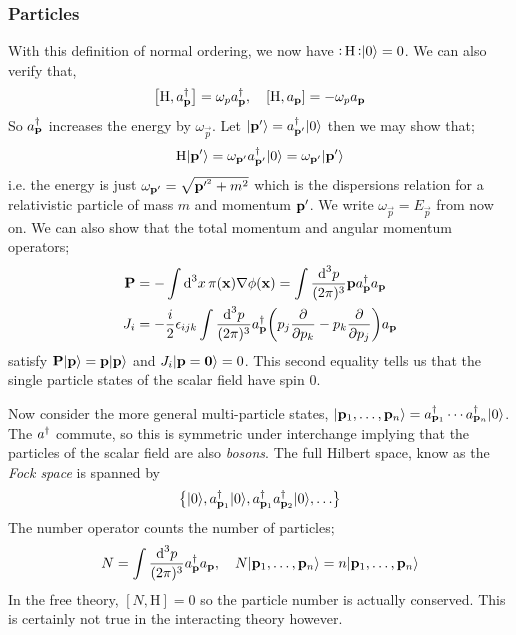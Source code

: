 \subsubsection{Particles}
With this definition of normal ordering, we now have $\normord{\text{H}}\ket{0} = 0$. We can also verify that,
\begin{equation}
\left[\text{H}, a_{\vec p}\dagg\right] = \omega_p a_{\vec p}\dagg, \quad \left[\text{H}, a_{\vec p}\right] = -\omega_p a_{\vec p}
\end{equation}
So $a_{\mathbf p}^{\dagger}$ increases the energy by $\omega_{\vec p}$. Let $\ket{\vec{p}\pr} = a_{\vec{p}\pr}\dagg \ket{0}$ then we may show that; 
\begin{equation}
\text{H}\ket{\vec{p}\pr} = \omega_{\vec{p}\pr} a_{\vec{p}\pr}\dagg \ket{0} = \omega_{\vec{p}\pr}\ket{\vec{p}\pr}
\end{equation}
i.e. the energy is just $\omega_{\mathbf{p}^{\prime}} = \sqrt{\mathbf{p}^{\prime^2} + m^2}$ which is the dispersions relation  for a relativistic particle of mass $m$ and momentum $\mathbf{p}^{\prime}$. We write $\omega_{\vec{p}} = E_{\vec{p}}$ from now on. We can also show that the total momentum and angular momentum operators;
\begin{align}
\vec P &= -\int{\upd{^3 x} \pi(\vec x) \nabla \phi(\vec x)} = \int{\frac{\ud^3 p}{(2\pi)^3} \vec p a_{\vec p}\dagg a_{\vec p}} \\
J_i &= -\frac{i}{2}\epsilon_{ijk}\int{\frac{\ud^3 p}{(2\pi)^3} a_{\vec p}\dagg\left(p_j \frac{\del}{\del p_k} - p_k \frac{\del}{\del p_j}\right)a_{\vec p}}
\end{align} 
satisfy $\vec P \ket{\vec p} = \vec p \ket{\vec p}$ and $J_i \ket{\vec p = \vec 0} = 0$. This second equality tells us that the single particle states of the scalar field have spin $0$. 

\paraskip
Now consider the more general multi-particle states, $\ket{\vec{p}_1, \ldots, \vec{p}_n} = a_{\vec{p}_1}\dagg \cdots a_{\vec{p}_n}\dagg\ket{0}$. The $a^{\dagger}$ commute, so this is symmetric under interchange implying that the particles of the scalar field are also \emph{bosons}. The full Hilbert space, know as the \emph{Fock space} is spanned by 
\begin{equation}
\set{\ket{0}, a_{\vec{p}_1}\dagg\ket{0}, a_{\vec{p}_1}\dagg a_{\vec{p}_2}\dagg\ket{0}, \ldots}
\end{equation}
The number operator counts the number of particles;
\begin{equation}
N = \int{\frac{\ud^3 p}{(2\pi)^3} a_{\vec{p}}\dagg a_{\vec p}}, \quad N \ket{\vec{p}_1, \ldots, \vec{p}_n} = n\ket{\vec{p}_1, \ldots, \vec{p}_n} 
\end{equation}
In the free theory, $\left[N, \text{H}\right] = 0$ so the particle number is actually conserved. This is certainly not true in the interacting theory however. 

